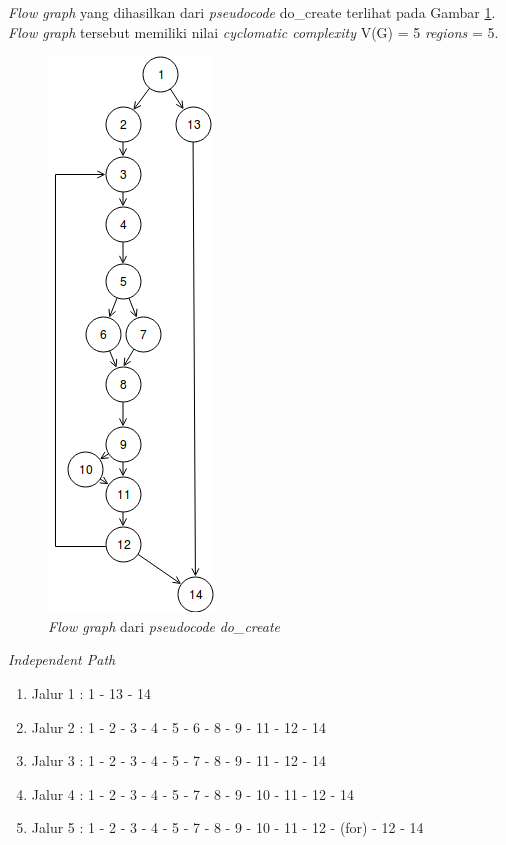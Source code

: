 \par\null\par
\noindent
\emph{Flow graph} yang dihasilkan dari \emph{pseudocode}
do\_create terlihat pada Gambar \ref{cfg:create-vm-f}. \emph{Flow graph} tersebut memiliki
nilai \emph{cyclomatic complexity} V(G) = 5 \emph{regions} = 5.

\begin{figure}[H]
  \centering
  \includegraphics[width=.18\linewidth]{img/test-case/do_create}
  \caption{\emph{Flow graph} dari \emph{pseudocode} \emph{do\_create}}
  \label{cfg:create-vm-f}
\end{figure}

\noindent
\emph{Independent Path}

\begin{enumerate}
\item Jalur 1 : 1 - 13 - 14
\item Jalur 2 : 1 - 2 - 3 - 4 - 5 - 6 - 8 - 9 - 11 - 12 - 14
\item Jalur 3 : 1 - 2 - 3 - 4 - 5 - 7 - 8 - 9 - 11 - 12 - 14
\item Jalur 4 : 1 - 2 - 3 - 4 - 5 - 7 - 8 - 9 - 10 - 11 - 12 - 14
\item Jalur 5 : 1 - 2 - 3 - 4 - 5 - 7 - 8 - 9 - 10 - 11 - 12 - (for) - 12 - 14
\end{enumerate}

